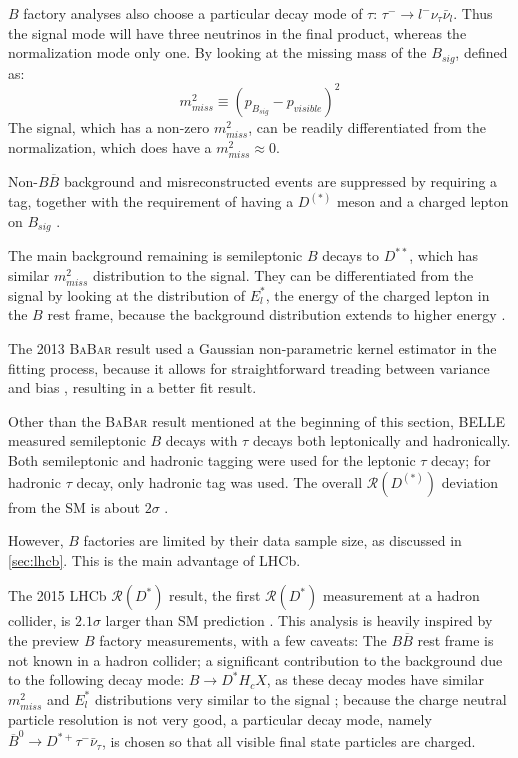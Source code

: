 \documentclass[12pt,letterpaper]{article}
\def\BaBar/{\textsc{BaBar}}
\def\RDst/{\ensuremath{\mathcal{R}(D^{*})}}
\def\RDDst/{\ensuremath{\mathcal{R}(D^{(*)})}}
\begin{document}
$B$ factory analyses also choose a particular decay mode of $\tau$:
$\tau^- \rightarrow l^- \nu_\tau \bar{\nu}_l$.
Thus the signal mode will have three neutrinos in the final product,
whereas the normalization mode only one.
By looking at the missing mass of the $B_{sig}$, defined as:
\begin{equation}
    m^2_{miss} \equiv \left(p_{B_{sig}} - p_{visible}\right)^2
\end{equation}
The signal, which has a non-zero $m^2_{miss}$, can be readily differentiated
from the normalization, which does have a $m^2_{miss} \approx 0$.

Non-$B \overline{B}$ background and misreconstructed events are suppressed by
requiring a tag, together with the requirement of having a $D^{(*)}$ meson and a
charged lepton on $B_{sig}$ \cite{Ciezarek:2017yzh}.

The main background remaining is semileptonic $B$ decays to $D^{**}$, which has
similar $m^2_{miss}$ distribution to the signal.
They can be differentiated from the signal by looking at the distribution of
$E^{*}_l$, the energy of the charged lepton in the $B$ rest
frame, because the background distribution extends to higher
energy \cite{Ciezarek:2017yzh}.

The 2013 \BaBar/ result used a Gaussian non-parametric kernel estimator in the
fitting process, because it allows for straightforward treading between variance
and bias \cite{Lees:2013uzd}, resulting in a better fit result.

Other than the \BaBar/ result mentioned at the beginning of this section,
BELLE measured semileptonic $B$ decays with $\tau$ decays both
leptonically and hadronically.
Both semileptonic and hadronic tagging were used for the leptonic $\tau$ decay;
for hadronic $\tau$ decay, only hadronic tag was used.
The overall \RDDst/ deviation from the SM is about
$2\sigma$ \cite{Hirose:2017185}.

However, $B$ factories are limited by their data sample size, as discussed
in \autoref{sec:lhcb}.
This is the main advantage of LHCb.

The 2015 LHCb \RDst/ result, the first \RDst/ measurement at a hadron collider,
is $2.1\sigma$ larger than SM prediction \cite{LHCb:PhysRevLett.115.111803}.
This analysis is heavily inspired by the preview $B$ factory measurements, with
a few caveats:
The $B \overline{B}$ rest frame is not known in a hadron collider;
a significant contribution to the background due to the following decay mode:
$B \rightarrow D^* H_c X$, as these decay modes have similar $m^2_{miss}$ and
$E^{*}_l$ distributions very similar to the signal \cite{Ciezarek:2017yzh};
because the charge neutral particle resolution is not very good, a particular
decay mode, namely $\overline{B}^0 \rightarrow D^{*+} \tau^- \bar{\nu}_\tau$, is
chosen so that all visible final state particles are charged.
\end{document}
